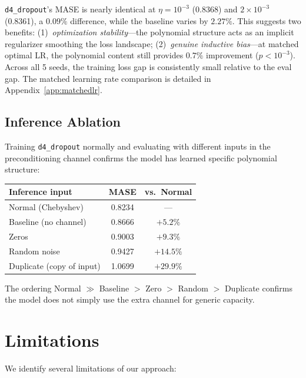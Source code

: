 \documentclass{article}
\begin{document}
\texttt{d4\_dropout}'s MASE is nearly identical at $\eta = 10^{-3}$ (0.8368) and $2 \times 10^{-3}$ (0.8361), a $0.09\%$ difference, while the baseline varies by $2.27\%$. This suggests two benefits: (1)~\emph{optimization stability}---the polynomial structure acts as an implicit regularizer smoothing the loss landscape; (2)~\emph{genuine inductive bias}---at matched optimal LR, the polynomial content still provides $0.7\%$ improvement ($p < 10^{-3}$). Across all 5 seeds, the training loss gap is consistently small relative to the eval gap. The matched learning rate comparison is detailed in Appendix~\ref{app:matchedlr}.

\subsection{Inference Ablation}

Training \texttt{d4\_dropout} normally and evaluating with different inputs in the preconditioning channel confirms the model has learned specific polynomial structure:

\begin{center}
\small
\begin{tabular}{lcc}
\toprule
\textbf{Inference input} & \textbf{MASE} & \textbf{vs.\ Normal} \\
\midrule
Normal (Chebyshev) & 0.8234 & --- \\
Baseline (no channel) & 0.8666 & $+5.2\%$ \\
Zeros & 0.9003 & $+9.3\%$ \\
Random noise & 0.9427 & $+14.5\%$ \\
Duplicate (copy of input) & 1.0699 & $+29.9\%$ \\
\bottomrule
\end{tabular}
\end{center}

The ordering Normal $\gg$ Baseline $>$ Zero $>$ Random $>$ Duplicate confirms the model does not simply use the extra channel for generic capacity.

\section{Limitations}
\label{sec:limitations}

We identify several limitations of our approach:
\end{document}
